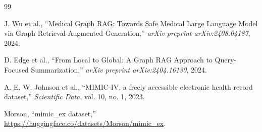\documentclass[a4paper,12pt,twoside]{report}
\begin{document}
\begin{thebibliography}{99}

J. Wu et al.,
``Medical Graph RAG: Towards Safe Medical Large Language Model via Graph Retrieval-Augmented Generation,''
\textit{arXiv preprint arXiv:2408.04187}, 2024.

D. Edge et al.,
``From Local to Global: A Graph RAG Approach to Query-Focused Summarization,''
\textit{arXiv preprint arXiv:2404.16130}, 2024.

A. E. W. Johnson et al.,
``MIMIC-IV, a freely accessible electronic health record dataset,''
\textit{Scientific Data}, vol. 10, no. 1, 2023.

Morson,
``mimic\_ex dataset,''
\url{https://huggingface.co/datasets/Morson/mimic_ex}.

\end{thebibliography}
\end{document}

